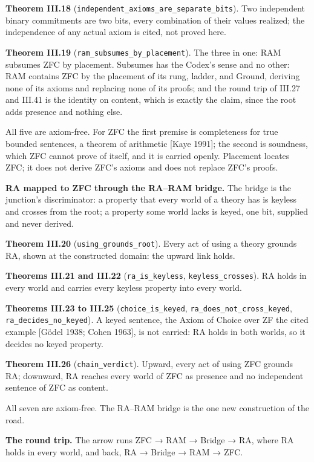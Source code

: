 \documentclass[10pt,twocolumn]{article}
\begin{document}
\textbf{Theorem III.18}
(\texttt{independent\_axioms\_are\_separate\_bits}). Two independent
binary commitments are two bits, every combination of their values
realized; the independence of any actual axiom is cited, not proved
here.

\textbf{Theorem III.19} (\texttt{ram\_subsumes\_by\_placement}). The
three in one: RAM subsumes ZFC by placement. Subsumes has the Codex's
sense and no other: RAM contains ZFC by the placement of its rung,
ladder, and Ground, deriving none of its axioms and replacing none of
its proofs; and the round trip of III.27 and III.41 is the identity on
content, which is exactly the claim, since the root adds presence and
nothing else.

All five are axiom-free. For ZFC the first premise is completeness for
true bounded sentences, a theorem of arithmetic {[}Kaye 1991{]}; the
second is soundness, which ZFC cannot prove of itself, and it is carried
openly. Placement locates ZFC; it does not derive ZFC's axioms and does
not replace ZFC's proofs.

\textbf{RA mapped to ZFC through the RA--RAM bridge.} The bridge is the
junction's discriminator: a property that every world of a theory has is
keyless and crosses from the root; a property some world lacks is keyed,
one bit, supplied and never derived.

\textbf{Theorem III.20} (\texttt{using\_grounds\_root}). Every act of
using a theory grounds RA, shown at the constructed domain: the upward
link holds.

\textbf{Theorems III.21 and III.22} (\texttt{ra\_is\_keyless},
\texttt{keyless\_crosses}). RA holds in every world and carries every
keyless property into every world.

\textbf{Theorems III.23 to III.25} (\texttt{choice\_is\_keyed},
\texttt{ra\_does\_not\_cross\_keyed}, \texttt{ra\_decides\_no\_keyed}).
A keyed sentence, the Axiom of Choice over ZF the cited example {[}Gödel
1938; Cohen 1963{]}, is not carried: RA holds in both worlds, so it
decides no keyed property.

\textbf{Theorem III.26} (\texttt{chain\_verdict}). Upward, every act of
using ZFC grounds RA; downward, RA reaches every world of ZFC as
presence and no independent sentence of ZFC as content.

All seven are axiom-free. The RA--RAM bridge is the one new construction
of the road.

\textbf{The round trip.} The arrow runs ZFC → RAM → Bridge → RA, where
RA holds in every world, and back, RA → Bridge → RAM → ZFC.
\end{document}
